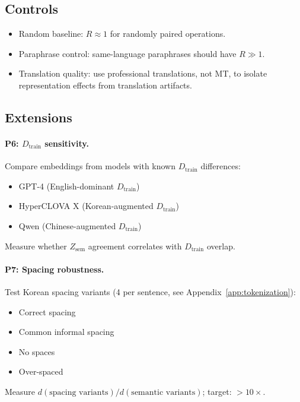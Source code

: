 \documentclass[11pt]{article}
\theoremstyle{definition}
\newcommand{\Zsem}{Z_{\text{sem}}}
\newcommand{\Dtrain}{D_{\text{train}}}
\begin{document}
\subsection{Controls}

\begin{itemize}[nosep]
  \item Random baseline: $R \approx 1$ for randomly paired operations.
  \item Paraphrase control: same-language paraphrases should have $R \gg 1$.
  \item Translation quality: use professional translations, not MT, to isolate representation effects from translation artifacts.
\end{itemize}

\subsection{Extensions}

\paragraph{P6: $\Dtrain$ sensitivity.}
Compare embeddings from models with known $\Dtrain$ differences:
\begin{itemize}[nosep]
  \item GPT-4 (English-dominant $\Dtrain$)
  \item HyperCLOVA X (Korean-augmented $\Dtrain$)
  \item Qwen (Chinese-augmented $\Dtrain$)
\end{itemize}
Measure whether $\Zsem$ agreement correlates with $\Dtrain$ overlap.

\paragraph{P7: Spacing robustness.}
Test Korean spacing variants (4 per sentence, see Appendix~\ref{app:tokenization}):
\begin{itemize}[nosep]
  \item Correct spacing
  \item Common informal spacing
  \item No spaces
  \item Over-spaced
\end{itemize}
Measure $d(\text{spacing variants}) / d(\text{semantic variants})$; target: $> 10\times$.
\end{document}
